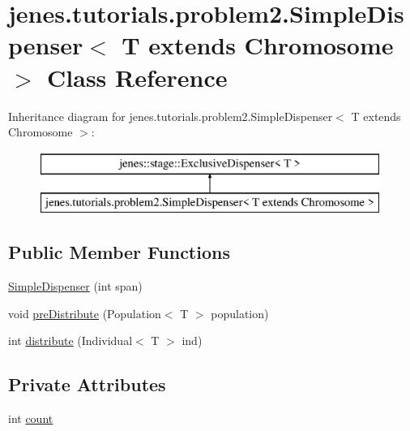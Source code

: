 \hypertarget{classjenes_1_1tutorials_1_1problem2_1_1_simple_dispenser_3_01_t_01extends_01_chromosome_01_4}{\section{jenes.\-tutorials.\-problem2.\-Simple\-Dispenser$<$ T extends Chromosome $>$ Class Reference}
\label{classjenes_1_1tutorials_1_1problem2_1_1_simple_dispenser_3_01_t_01extends_01_chromosome_01_4}
}
Inheritance diagram for jenes.\-tutorials.\-problem2.\-Simple\-Dispenser$<$ T extends Chromosome $>$\-:\begin{figure}[H]
\begin{center}
\leavevmode
\includegraphics[height=2.000000cm]{classjenes_1_1tutorials_1_1problem2_1_1_simple_dispenser_3_01_t_01extends_01_chromosome_01_4}
\end{center}
\end{figure}
\subsection*{Public Member Functions}
\begin{DoxyCompactItemize}
\item 
\hyperlink{classjenes_1_1tutorials_1_1problem2_1_1_simple_dispenser_3_01_t_01extends_01_chromosome_01_4_a0c8ee6561c4336810cacc9fb7dad7993}{Simple\-Dispenser} (int span)
\item 
void \hyperlink{classjenes_1_1tutorials_1_1problem2_1_1_simple_dispenser_3_01_t_01extends_01_chromosome_01_4_adeddb967a293817fab3f83bd9a04736d}{pre\-Distribute} (Population$<$ T $>$ population)
\item 
int \hyperlink{classjenes_1_1tutorials_1_1problem2_1_1_simple_dispenser_3_01_t_01extends_01_chromosome_01_4_a36cc589e5e73dd601e4bbf62835329ca}{distribute} (Individual$<$ T $>$ ind)
\end{DoxyCompactItemize}
\subsection*{Private Attributes}
\begin{DoxyCompactItemize}
\item 
int \hyperlink{classjenes_1_1tutorials_1_1problem2_1_1_simple_dispenser_3_01_t_01extends_01_chromosome_01_4_a89ff326530f8e9ef6486c23766897406}{count}
\end{DoxyCompactItemize}


